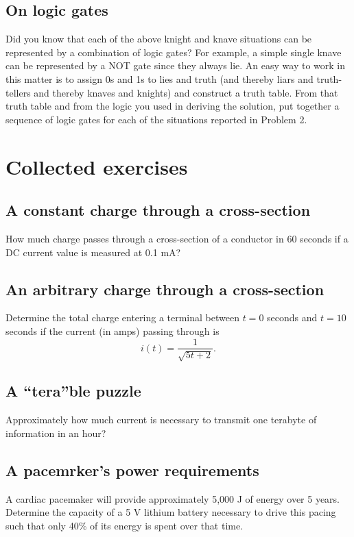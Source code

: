 \documentclass[11pt]{book}
\begin{document}
\newpage

\section{On logic gates}
Did you know that each of the above knight and knave situations can be represented by a combination of logic gates? For example, a simple single knave can be represented by a NOT gate since they always lie. An easy way to work in this matter is to assign 0s and 1s to lies and truth (and thereby liars and truth-tellers and thereby knaves and knights) and construct a truth table. From that truth table and from the logic you used in deriving the solution, put together a sequence of logic gates for each of the situations reported in Problem 2.


\chapter{Collected exercises}
\minitoc
\section{A constant charge through a cross-section}
How much charge passes through a cross-section of a conductor in 60 seconds if a DC current value is measured at 0.1 mA?


\section{An arbitrary charge through a cross-section}
Determine the total charge entering a terminal between $t = 0$ seconds and $t = 10$ seconds if the current (in amps) passing through is
\begin{equation}
	i(t) = \frac{1}{\sqrt{5t+2}}. 
\end{equation} 


\section{A ``tera''ble puzzle}
Approximately how much current is necessary to transmit one terabyte of information in an hour?


\section{A pacemrker's power requirements}
A cardiac pacemaker will provide approximately 5,000 J of energy over 5 years. Determine the capacity of a 5 V lithium battery necessary to drive this pacing such that only 40\% of its energy is spent over that time.
\end{document}
